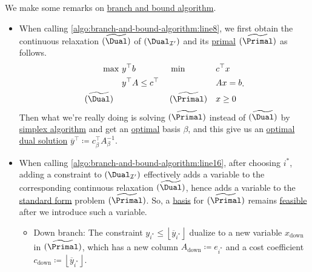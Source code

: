 \begin{remark}
	We make some remarks on \hyperref[algo:branch-and-bound-algorithm]{branch and bound algorithm}.
	\begin{itemize}
		\item When calling \autoref{algo:branch-and-bound-algorithm:line8}, we first obtain the continuous relaxation \((\widetilde{\Dual})\) of \((\Dual_{\mathcal{I} ^\prime })\) and its \hyperref[def:primal]{primal} \((\widetilde{\Primal} )\) as follows.
		      \[
			      \begin{alignedat}{5}
				      \max ~                   & y^{\top}b\qquad\qquad  &  & \min~                      &  & c^{\top}x \\
				                               & y^{\top}A\leq c^{\top} &  &                            &  & Ax = b    \\
				      (\widetilde{\Dual})\quad &                        &  & (\widetilde{\Primal})\quad &  & x\geq  0
			      \end{alignedat}.
		      \]
		      Then what we're really doing is solving \((\widetilde{\Primal})\) instead of \((\widetilde{\Dual} )\) by \hyperref[algo:simplex-algorithm]{simplex algorithm} and get an \hyperref[def:optimal-solution]{optimal} basis \(\beta\), and this give us an \hyperref[def:optimal-solution]{optimal} \hyperref[def:dual-basic-solution]{dual solution} \(\overline{y}^{\top}\coloneqq c^{\top}_{\beta}A^{-1} _{\beta}\).
		\item When calling \autoref{algo:branch-and-bound-algorithm:line16}, after choosing \(i^{\ast} \), adding a constraint to \((\Dual_{\mathcal{I} ^\prime })\) effectively adds a variable to the corresponding continuous relaxation \((\widetilde{\Dual})\), hence adds a variable to the \hyperref[def:standard-form]{standard form} problem \((\widetilde{\Primal} )\). So, a \hyperref[def:basis]{basis} for \((\widetilde{\Primal})\) remains \hyperref[def:feasible-solution]{feasible} after we introduce such a variable.
		      \begin{itemize}
			      \item\label{rmk:down-branch} Down branch: The constraint \(y_{i^{\ast}} \leq \left\lfloor \overline{y}_{i^{\ast}} \right\rfloor\) dualize to a new variable \(x_{\text{down}}\) in \((\widetilde{\Primal})\), which has a new column \(A_{\text{down}}\coloneqq e_{i^{\ast}}\) and a cost coefficient \(c_{\text{down}}\coloneqq \left\lfloor \overline{y} _{i^{\ast}}\right\rfloor \).
			            \[
				            \begin{alignedat}{5}

\end{alignedat}\]
\end{itemize}
\end{itemize}
\end{remark}
